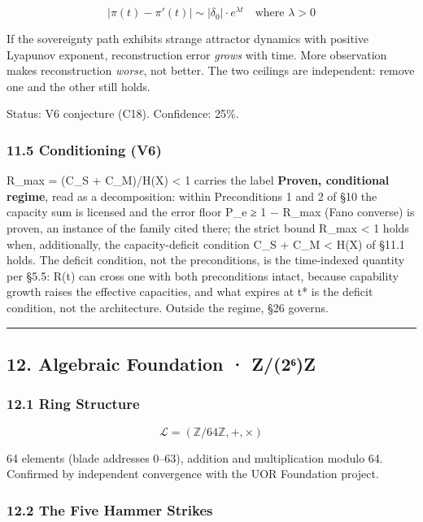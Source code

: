 \documentclass[
]{article}
\begin{document}
\[|\pi(t) - \pi'(t)| \sim |\delta_0| \cdot e^{\lambda t} \quad \text{where } \lambda > 0\]

If the sovereignty path exhibits strange attractor dynamics with
positive Lyapunov exponent, reconstruction error \emph{grows} with time.
More observation makes reconstruction \emph{worse}, not better. The two
ceilings are independent: remove one and the other still holds.

Status: V6 conjecture (C18). Confidence: 25\%.

\subsubsection{11.5 Conditioning (V6)}\label{conditioning-v6}

R\_max = (C\_S + C\_M)/H(X) \textless{} 1 carries the label
\textbf{Proven, conditional regime}, read as a decomposition: within
Preconditions 1 and 2 of §10 the capacity sum is licensed and the error
floor P\_e ≥ 1 − R\_max (Fano converse) is proven, an instance of the
family cited there; the strict bound R\_max \textless{} 1 holds when,
additionally, the capacity-deficit condition C\_S + C\_M \textless{}
H(X) of §11.1 holds. The deficit condition, not the preconditions, is
the time-indexed quantity per §5.5: R(t) can cross one with both
preconditions intact, because capability growth raises the effective
capacities, and what expires at t* is the deficit condition, not the
architecture. Outside the regime, §26 governs.

\begin{center}\rule{0.5\linewidth}{0.5pt}\end{center}

\subsection{12. Algebraic Foundation ·
Z/(2⁶)Z}\label{algebraic-foundation-z2ux2076z}

\subsubsection{12.1 Ring Structure}\label{ring-structure}

\[\mathcal{L} = (\mathbb{Z}/64\mathbb{Z}, +, \times)\]

64 elements (blade addresses 0--63), addition and multiplication modulo
64. Confirmed by independent convergence with the UOR Foundation
project.

\subsubsection{12.2 The Five Hammer
Strikes}\label{the-five-hammer-strikes}
\end{document}
